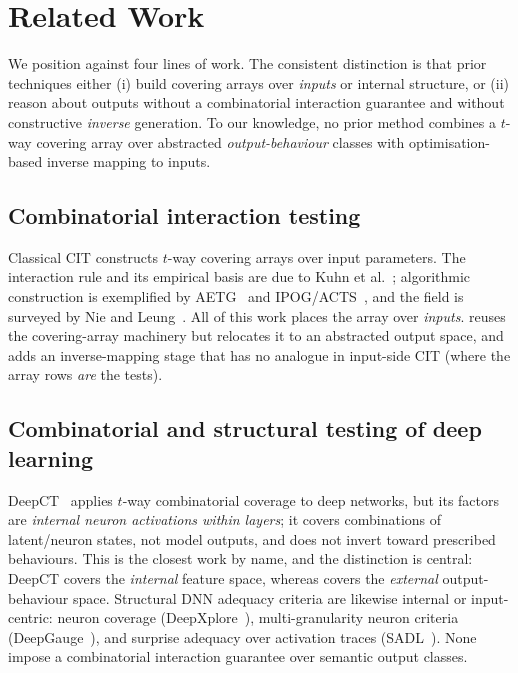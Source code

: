 \section{Related Work}
\label{sec:related}

We position \rnwise{} against four lines of work. The consistent distinction is
that prior techniques either (i) build covering arrays over \emph{inputs} or
internal structure, or (ii) reason about outputs without a combinatorial
interaction guarantee and without constructive \emph{inverse} generation. To our
knowledge, no prior method combines a $t$-way covering array over abstracted
\emph{output-behaviour} classes with optimisation-based inverse mapping to inputs.

\subsection{Combinatorial interaction testing}
Classical CIT constructs $t$-way covering arrays over input parameters. The
interaction rule and its empirical basis are due to Kuhn et
al.~\cite{kuhn2004software}; algorithmic construction is exemplified by
AETG~\cite{cohen1997aetg} and IPOG/ACTS~\cite{lei2007ipog}, and the field is
surveyed by Nie and Leung~\cite{nie2011survey}. All of this work places the array
over \emph{inputs}. \rnwise{} reuses the covering-array machinery but relocates it
to an abstracted output space, and adds an inverse-mapping stage that has no
analogue in input-side CIT (where the array rows \emph{are} the tests).

\subsection{Combinatorial and structural testing of deep learning}
DeepCT~\cite{ma2019deepct} applies $t$-way combinatorial coverage to deep
networks, but its factors are \emph{internal neuron activations within layers};
it covers combinations of latent/neuron states, not model outputs, and does not
invert toward prescribed behaviours. This is the closest work by name, and the
distinction is central: DeepCT covers the \emph{internal} feature space, whereas
\rnwise{} covers the \emph{external} output-behaviour space. Structural DNN
adequacy criteria are likewise internal or input-centric: neuron coverage
(DeepXplore~\cite{pei2017deepxplore}), multi-granularity neuron criteria
(DeepGauge~\cite{ma2018deepgauge}), and surprise adequacy over activation traces
(SADL~\cite{kim2019surprise}). None impose a combinatorial interaction guarantee
over semantic output classes.

